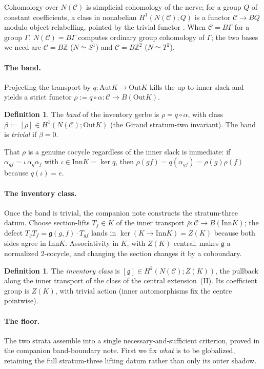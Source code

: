 \documentclass[11pt]{article}
\theoremstyle{definition}
\newtheorem{definition}[theorem]{Definition}
\newcommand{\C}{\mathcal{C}}
\newcommand{\Z}{\mathbb{Z}}
\newcommand{\Aut}{\mathrm{Aut}}
\newcommand{\Inn}{\mathrm{Inn}}
\newcommand{\Out}{\mathrm{Out}}
\newcommand{\gerbe}{\mathfrak{g}}
\begin{document}
Cohomology over $N(\C)$ is simplicial cohomology of the nerve; for a group $Q$ of constant
coefficients, a class in nonabelian $H^1(N(\C);Q)$ is a functor $\C\to BQ$ modulo
object-relabelling, pointed by the trivial functor \cite{giraud}. When $\C=B\Gamma$ for a
group $\Gamma$, $N(\C)=B\Gamma$ computes ordinary group cohomology of $\Gamma$; the two bases
we need are $\C=B\Z$ ($N\simeq S^1$) and $\C=B\Z^2$ ($N\simeq T^2$).

\paragraph{The band.} Projecting the transport by $q\colon\Aut K\to\Out K$ kills the
up-to-inner slack and yields a strict functor $\rho:=q\circ\alpha\colon\C\to B(\Out K)$.

\begin{definition}\label{def:band}
The \emph{band} of the inventory gerbe is $\rho=q\circ\alpha$, with class
$\beta:=[\rho]\in H^1(N(\C);\Out K)$ (the Giraud stratum-two invariant). The band is
\emph{trivial} if $\beta=0$.
\end{definition}

That $\rho$ is a genuine cocycle regardless of the inner slack is immediate: if
$\alpha_{gf}=\iota\,\alpha_g\alpha_f$ with $\iota\in\Inn K=\ker q$, then
$\rho(gf)=q(\alpha_{gf})=\rho(g)\rho(f)$ because $q(\iota)=e$.

\paragraph{The inventory class.} Once the band is trivial, the companion note constructs the
stratum-three datum. Choose section-lifts $T_f\in K$ of the inner transport
$\bar\rho\colon\C\to B(\Inn K)$; the defect $T_gT_f=\gerbe(g,f)\cdot T_{gf}$ lands in
$\ker(K\to\Inn K)=Z(K)$ because both sides agree in $\Inn K$. Associativity in $K$, with
$Z(K)$ central, makes $\gerbe$ a normalized $2$-cocycle, and changing the section changes it
by a coboundary.

\begin{definition}\label{def:invclass}
The \emph{inventory class} is $[\gerbe]\in H^2(N(\C);Z(K))$, the pullback along the inner
transport of the class of the central extension~(II). Its coefficient group is $Z(K)$, with
trivial action (inner automorphisms fix the centre pointwise).
\end{definition}

\paragraph{The floor.} The two strata assemble into a single necessary-and-sufficient
criterion, proved in the companion band-boundary note. First we fix \emph{what} is to be
globalized, retaining the full stratum-three lifting datum rather than only its outer shadow.
\end{document}
